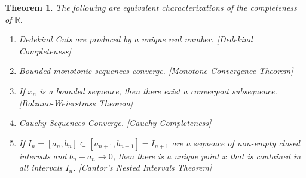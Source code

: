 \documentclass[12pt,oneside]{book}
\theoremstyle{mystyle}
\newtheorem{theorem}{Theorem}[section]
\begin{document}
\begin{theorem}
The following are equivalent characterizations of the completeness of $\mathbb{R}$.
\begin{enumerate}
\item Dedekind Cuts are produced by a unique real number. \hfill [Dedekind Completeness]
\item Bounded monotonic sequences converge. \hfill [Monotone Convergence Theorem]
\item If $x_n$ is a bounded sequence, then there exist a convergent subsequence. \hfill [Bolzano-Weierstrass Theorem]
\item Cauchy Sequences Converge. \hfill [Cauchy Completeness]
\item If $I_n = [a_n,b_n]\subset [a_{n+1},b_{n+1}]=I_{n+1}$ are a sequence of non-empty closed intervals and $b_n-a_n \rightarrow 0$, then there is a unique point $x$ that is contained in all intervals $I_n$. \hfill [Cantor's Nested Intervals Theorem]
\end{enumerate}
\end{theorem}
\end{document}
